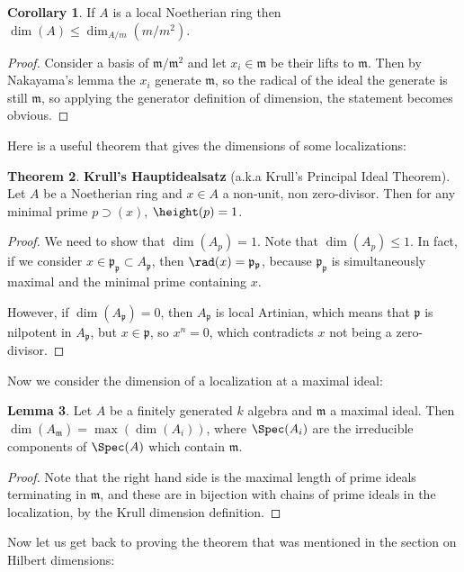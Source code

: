 \documentclass[12 pt]{article}
\theoremstyle{definition}
\newtheorem{theorem}{Theorem}[section]
\newtheorem{corollary}[theorem]{Corollary}
\newtheorem{lemma}[theorem]{Lemma}
\newcommand\fp{{\mathfrak p}}
\begin{document}
\begin{corollary} If $A$ is a local Noetherian ring then $\dim(A) \leq \dim_{A/m}(m/m^2)$.
\label{loc ring dim ineq}
\end{corollary}
\begin{proof} Consider a basis of $\mathfrak{m}/\mathfrak{m}^2$ and let $x_i \in \mathfrak{m}$ be their lifts to $\mathfrak{m}$. Then by Nakayama's lemma the $x_i$ generate $\mathfrak{m}$, so the radical of the ideal the generate is still $\mathfrak{m}$, so applying the generator definition of dimension, the statement becomes obvious.
\end{proof}


Here is a useful theorem that gives the dimensions of some localizations:
\begin{theorem} \textbf{Krull's Hauptidealsatz} (a.k.a Krull's Principal Ideal Theorem). Let $A$ be a Noetherian ring and $x \in A$ a non-unit, non zero-divisor. Then for any minimal prime $p \supset (x)$, $\height(p) =1$.
\end{theorem}
\begin{proof} We need to show that $\dim(A_p)=1$. Note that $\dim(A_p) \leq 1$. In fact, if we consider $x \in \fp_\fp \subset A_\fp$, then $\rad(x)=\fp_\fp$, because $\fp_\fp$ is simultaneously maximal and the minimal prime containing $x$.

However, if $\dim(A_\fp)=0$, then $A_\fp$ is local Artinian, which means that $\fp$ is nilpotent in $A_\fp$, but $x \in \fp$, so $x^n=0$, which contradicts $x$ not being a zero-divisor.
\end{proof}


Now we consider the dimension of a localization at a maximal ideal:
\begin{lemma} Let $A$ be a finitely generated $k$ algebra and $\mathfrak{m}$ a maximal ideal. Then $\dim(A_\mathfrak{m})=\max(\dim(A_i))$, where $\Spec(A_i)$ are the irreducible components of $\Spec(A)$ which contain $\mathfrak{m}$.
\label{dim of localize at max ideal}
\end{lemma}
\begin{proof} Note that the right hand side is the maximal length of prime ideals terminating in $\mathfrak{m}$, and these are in bijection with chains of prime ideals in the localization, by the Krull dimension definition.
\end{proof}


Now let us get back to proving the theorem that was mentioned in the section on Hilbert dimensions:
\end{document}
